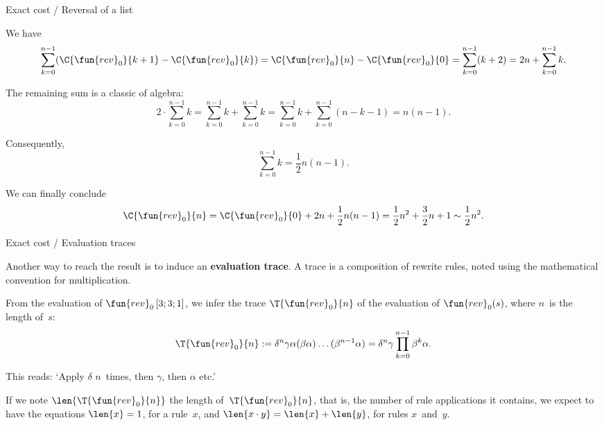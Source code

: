 %
\begin{frame}{Exact cost / Reversal of a list}

  We have
  \begin{equation*}
    \sum_{k=0}^{n-1}(\C{\fun{rev}_0}{k+1} - \C{\fun{rev}_0}{k})
    = \C{\fun{rev}_0}{n} - \C{\fun{rev}_0}{0}
    = \sum_{k=0}^{n-1}(k+2)
    = 2n + \sum_{k=0}^{n-1}{k}.
  \end{equation*}

  The remaining sum is a classic of algebra:
  \begin{equation*}
    2 \cdot \sum_{k=0}^{n-1}{k}
    = \sum_{k=0}^{n-1}{k} + \sum_{k=0}^{n-1}{k}
    = \sum_{k=0}^{n-1}{k} + \sum_{k=0}^{n-1}(n-k-1)
    = n(n-1).
  \end{equation*}

  Consequently,
  \begin{equation*}
    \sum_{k=0}^{n-1}{k} = \frac{1}{2} n(n-1).
  \end{equation*}

  We can finally conclude
  \begin{equation*}
    \C{\fun{rev}_0}{n}
    = \C{\fun{rev}_0}{0} + 2n + \frac{1}{2} n(n-1)
    = \frac{1}{2}n^2 + \frac{3}{2}n + 1
    \sim \frac{1}{2}n^2.
  \end{equation*}

\end{frame}

%
\begin{frame}{Exact cost / Evaluation traces}

  Another way to reach the result is to induce an \textbf{evaluation
    trace}. A trace is a composition of rewrite rules, noted using the
  mathematical convention for multiplication.

  \bigskip

  From the evaluation of \(\fun{rev}_0\,[3;3;1]\), we infer the trace
  \(\T{\fun{rev}_0}{n}\) of the evaluation of \(\fun{rev}_0(s)\),
  where \(n\)~is the length of~\(s\):
  \begin{equation*}
    \T{\fun{rev}_0}{n} \; \text{:=} \;
    \delta^n\gamma\alpha(\beta\alpha)\dots(\beta^{n-1}\alpha)
    = \delta^n\gamma \prod_{k=0}^{n-1}{\beta^k\alpha}.
  \end{equation*}

  This reads: `Apply \(\delta\) \(n\)~times, then \(\gamma\), then
  \(\alpha\) etc.'

  \bigskip

  If we note \(\len{\T{\fun{rev}_0}{n}}\) the length
  of~\(\T{\fun{rev}_0}{n}\), that is, the number of rule applications
  it contains, we expect to have the equations \(\len{x} = 1\), for a
  rule~\(x\), and \(\len{x \cdot y} = \len{x} + \len{y}\), for rules
  \(x\)~and~\(y\).

\end{frame}

